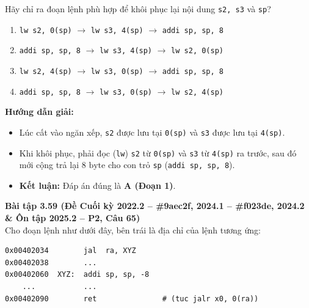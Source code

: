 Hãy chỉ ra đoạn lệnh phù hợp để khôi phục lại nội dung \texttt{s2, s3} và \texttt{sp}?
\begin{enumerate}[label=\Alph*.]
    \item \texttt{lw s2, 0(sp)} $\rightarrow$ \texttt{lw s3, 4(sp)} $\rightarrow$ \texttt{addi sp, sp, 8}
    \item \texttt{addi sp, sp, 8} $\rightarrow$ \texttt{lw s3, 4(sp)} $\rightarrow$ \texttt{lw s2, 0(sp)}
    \item \texttt{lw s2, 4(sp)} $\rightarrow$ \texttt{lw s3, 0(sp)} $\rightarrow$ \texttt{addi sp, sp, 8}
    \item \texttt{addi sp, sp, 8} $\rightarrow$ \texttt{lw s3, 0(sp)} $\rightarrow$ \texttt{lw s2, 4(sp)}
\end{enumerate}
\textbf{Hướng dẫn giải:}
\begin{itemize}
    \item Lúc cất vào ngăn xếp, \texttt{s2} được lưu tại \texttt{0(sp)} và \texttt{s3} được lưu tại \texttt{4(sp)}.
    \item Khi khôi phục, phải đọc (\texttt{lw}) \texttt{s2} từ \texttt{0(sp)} và \texttt{s3} từ \texttt{4(sp)} ra trước, sau đó mới cộng trả lại $8\text{ byte}$ cho con trỏ \texttt{sp} (\texttt{addi sp, sp, 8}).
    \item \textbf{Kết luận:} Đáp án đúng là \textbf{A (Đoạn 1)}.
\end{itemize}

\textbf{Bài tập 3.59 (Đề Cuối kỳ 2022.2 -- \#9aec2f, 2024.1 -- \#f023de, 2024.2 \& Ôn tập 2025.2 -- P2, Câu 65)}\\
Cho đoạn lệnh như dưới đây, bên trái là địa chỉ của lệnh tương ứng:

\noindent\begin{minipage}{\linewidth}
\begin{lstlisting}
0x00402034        jal  ra, XYZ
0x00402038        ...
0x00402060  XYZ:  addi sp, sp, -8
    ...           ...
0x00402090        ret               # (tuc jalr x0, 0(ra))
\end{lstlisting}
\end{minipage}

